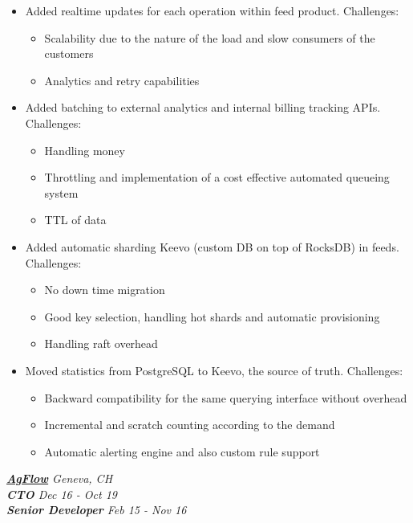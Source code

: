 \documentclass[line, margin]{res}
\begin{document}
\begin{resume}
\begin{itemize}
	\item{Added realtime updates for each operation within feed product. Challenges:}
		\begin{itemize} \itemsep -5pt \small
		\vspace{-.2cm}
		\item Scalability due to the nature of the load and slow consumers of the customers
		\item Analytics and retry capabilities
		\end{itemize}
	
	\item{Added batching to external analytics and internal billing tracking APIs. Challenges:}
		\begin{itemize} \itemsep -5pt \small
		\vspace{-.2cm}
		\item Handling money
		\item Throttling and implementation of a cost effective automated queueing system
		\item TTL of data
		\end{itemize}
		
	\item{Added automatic sharding Keevo (custom DB on top of RocksDB) in feeds. Challenges:}
		\begin{itemize} \itemsep -5pt \small
		\vspace{-.2cm}
		\item No down time migration
		\item Good key selection, handling hot shards and automatic provisioning
		\item Handling raft overhead
		\end{itemize}
		
	\item{Moved statistics from PostgreSQL to Keevo, the source of truth. Challenges:}
		\begin{itemize} \itemsep -5pt \small
		\vspace{-.2cm}
		\item Backward compatibility for the same querying interface without overhead
		\item Incremental and scratch counting according to the demand
		\item Automatic alerting engine and also custom rule support
		\end{itemize}
\end{itemize}

{\sl \textbf{\href{https://agflow.com}{AgFlow}} \hfill Geneva, CH} \\
{\sl \textbf{CTO} \hfill Dec 16 - Oct 19} \\
{\sl \textbf{Senior Developer} \hfill Feb 15 - Nov 16} \\


\end{resume}
\end{document}
